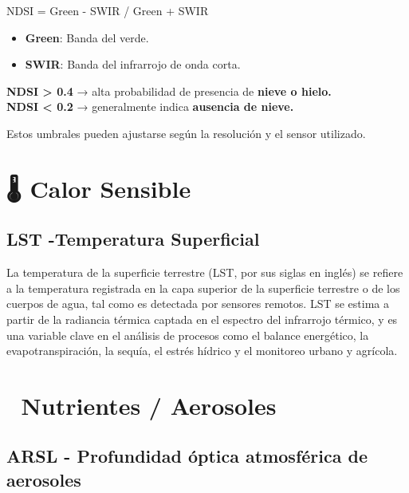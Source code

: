 \documentclass[
]{book}
\providecommand{\tightlist}{%
  \setlength{\itemsep}{0pt}\setlength{\parskip}{0pt}}
\begin{document}
NDSI = Green - SWIR / Green + SWIR\hspace{0pt}

\begin{itemize}
\tightlist
\item
  \textbf{Green}: Banda del verde.\\
\item
  \textbf{SWIR}: Banda del infrarrojo de onda corta.
\end{itemize}

\textbf{NDSI \textgreater{} 0.4} → alta probabilidad de presencia de \textbf{nieve o hielo.}\\
\textbf{NDSI \textless{} 0.2} → generalmente indica \textbf{ausencia de nieve.}

Estos umbrales pueden ajustarse según la resolución y el sensor utilizado.

\section{\texorpdfstring{\textbf{🌡️ Calor Sensible}}{🌡️ Calor Sensible}}\label{calor-sensible}

\subsection{\texorpdfstring{\textbf{LST} -Temperatura Superficial}{LST -Temperatura Superficial}}\label{lst--temperatura-superficial}

La temperatura de la superficie terrestre (LST, por sus siglas en inglés) se refiere a la temperatura registrada en la capa superior de la superficie terrestre o de los cuerpos de agua, tal como es detectada por sensores remotos. LST se estima a partir de la radiancia térmica captada en el espectro del infrarrojo térmico, y es una variable clave en el análisis de procesos como el balance energético, la evapotranspiración, la sequía, el estrés hídrico y el monitoreo urbano y agrícola.

\section{\texorpdfstring{\textbf{💨 Nutrientes / Aerosoles}}{💨 Nutrientes / Aerosoles}}\label{nutrientes-aerosoles}

\subsection{\texorpdfstring{\textbf{ARSL} - Profundidad óptica atmosférica de aerosoles}{ARSL - Profundidad óptica atmosférica de aerosoles}}\label{arsl---profundidad-uxf3ptica-atmosfuxe9rica-de-aerosoles}
\end{document}

